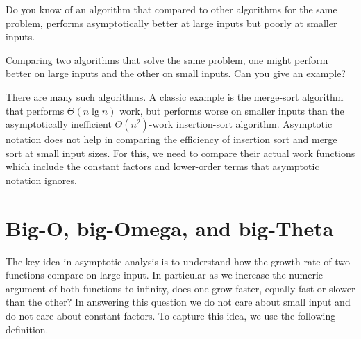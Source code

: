 \begin{teachask}
Do you know of an algorithm that compared to other algorithms for the
same problem, performs asymptotically better at large inputs but poorly
at smaller inputs.
\end{teachask}

\begin{flex}

  \begin{exercise}
    Comparing two algorithms that solve the same problem, one might
    perform better on large inputs and the other on small inputs.  
    Can you give an example? 
  \end{exercise}

  \begin{solution}
    There are many such algorithms.  
    A classic example is the merge-sort algorithm that performs
    $\Theta(n\lg{n})$ work, but performs worse on smaller inputs than the
    asymptotically inefficient $\Theta(n^2)$-work insertion-sort
    algorithm.
    Asymptotic notation does not help in comparing the efficiency of
    insertion sort and merge sort at small input sizes.
    For this, we need to compare their actual work functions which include
    the constant factors and lower-order terms that asymptotic notation
    ignores.
  \end{solution}

\end{flex}

\section{Big-O, big-Omega, and big-Theta}

\begin{gram}
  The key idea in asymptotic analysis is to understand how the growth
  rate of two functions compare on large input.  In 
  particular as we increase the numeric argument of both functions to
  infinity, does one grow faster, equally fast or slower than the
  other?   In
  answering this question we do not care about small input and 
  do not care about constant factors.  To capture this idea, we use the following
  definition.
\end{gram}


